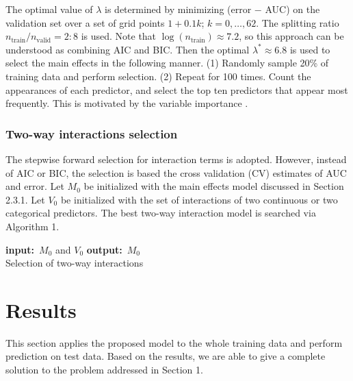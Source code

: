 \documentclass[12pt]{amsart}
\theoremstyle{definition}
\theoremstyle{remark}
\numberwithin{equation}{section}
\newcommand{\Input}{\textbf{input:}}
\newcommand{\Output}{\textbf{output:}}
\begin{document}
The optimal value of $\lambda$ is determined by minimizing (error $-$ AUC) on the validation set over a set of grid points $1 + 0.1k$; $k = 0,\ldots, 62$. The splitting ratio $n_{\text{train}} / n_{\text{valid}} = 2:8$ is used. Note that $\log(n_{\text{train}}) \approx 7.2$, so this approach can be understood as combining AIC and BIC. Then the optimal $\lambda^*\approx 6.8$ is used to select the main effects in the following manner. (1) Randomly sample 20\% of training data and perform selection. (2) Repeat for 100 times. Count the appearances of each predictor, and select the top ten predictors that appear most frequently. This is motivated by the variable importance \cite{hastie}. 


\subsubsection{Two-way interactions selection}

The stepwise forward selection for interaction terms is adopted. However, instead of AIC or BIC, the selection is based the cross validation (CV) estimates of AUC and error. Let $M_0$ be initialized with the main effects model discussed in Section 2.3.1. Let $V_0$ be initialized with the set of interactions of two continuous or two categorical predictors. The best two-way interaction model is searched via Algorithm 1. 

\begin{algorithm}[!h]
	\Input \ $M_0$ and $V_0$\;
	\Output {\ $M_0$} \\
	\caption{Selection of two-way interactions}
\end{algorithm}



\section{Results}

This section applies the proposed model to the whole training data and perform prediction on test data. 
Based on the results, we are able to give a complete solution to the problem addressed in Section 1. 
\end{document}
